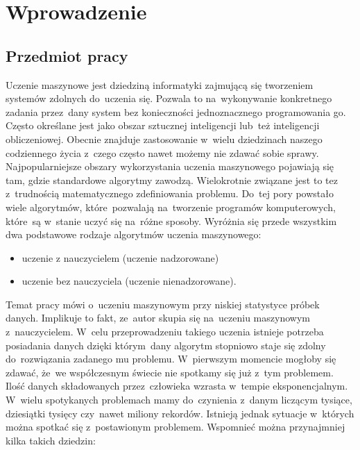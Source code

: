 \section{Wprowadzenie}\label{intro}
\subsection{Przedmiot pracy}\label{matter}
Uczenie maszynowe jest dziedziną informatyki zajmującą się tworzeniem systemów zdolnych do~uczenia się. Pozwala to na~wykonywanie konkretnego zadania przez~dany system bez konieczności jednoznacznego programowania go. 
Często określane jest jako obszar sztucznej inteligencji lub~też inteligencji obliczeniowej\cite{stefanowski}. Obecnie znajduje zastosowanie w~wielu dziedzinach naszego codziennego życia z~czego często nawet możemy nie zdawać sobie sprawy.
Najpopularniejsze obszary wykorzystania uczenia maszynowego pojawiają się tam, gdzie standardowe algorytmy zawodzą. Wielokrotnie związane jest to tez z~trudnością matematycznego zdefiniowania problemu. 
 Do~tej pory powstało wiele algorytmów, które~pozwalają na~tworzenie programów komputerowych, które~są w~stanie uczyć się na~różne sposoby. Wyróżnia się przede wszystkim dwa podstawowe rodzaje algorytmów uczenia maszynowego:
\begin{itemize}
\item uczenie z nauczycielem (uczenie nadzorowane)
\item uczenie bez nauczyciela (uczenie nienadzorowane).
\end{itemize}
Temat pracy mówi o~uczeniu maszynowym przy niskiej statystyce próbek danych. Implikuje to fakt, ze~autor skupia się na~uczeniu maszynowym z~nauczycielem. W~celu przeprowadzeniu takiego uczenia istnieje potrzeba posiadania danych dzięki którym~dany algorytm stopniowo staje się zdolny do~rozwiązania zadanego mu problemu.
 W~pierwszym momencie mogłoby się zdawać, że~we współczesnym świecie nie spotkamy się już z~tym problemem. Ilość danych składowanych przez~człowieka wzrasta w~tempie eksponencjalnym. W~wielu spotykanych problemach mamy do~czynienia z~danym liczącym tysiące, dziesiątki tysięcy czy~nawet miliony rekordów. Istnieją jednak sytuacje w~których można spotkać się z~postawionym problemem. Wspomnieć można przynajmniej kilka takich dziedzin:
